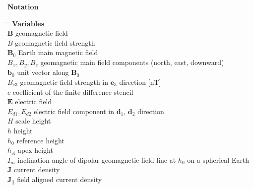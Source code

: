 %
\textbf{\Large{Notation}}
%
\begin{tabbing}
\hspace{5mm} \= \hspace{23mm} \=  \kill
%
\textbf{\Large{Variables}}                              \\

\>$\mathbf{B} $     \>  geomagnetic field  \\
\>$B$               \>  geomagnetic field strength   \\
\>$\mathbf{B}_0 $       \>  Earth main magnetic field  \\

\>$B_x, B_y, B_z$       \>  geomagnetic main field components (north, east, downward)  \\

\>$\mathbf{b}_0 $       \>  unit vector along $\mathbf{B}_0 $  \\

\>$B_{e3}$        	\>  geomagnetic field strength in $\mathbf{e}_3$ direction [nT]   \\

\>$c$        		\>  coefficient of the finite difference stencil   \\

\>$\mathbf E$        	\>  electric field   \\

\>$E_{d1}, E_{d2}$      \>  electric field component in $\mathbf{d}_1$,
                            $\mathbf{d}_2$ direction  \\

\>$H$        		\>  scale height    \\

\>$h$        		\>  height   \\

\>$h_0$        		\>  reference height   \\

\>$h_A$        		\>  apex height   \\

\>$I_m$        		\>  inclination angle of dipolar geomagnetic field line at $h_0$ on a spherical Earth  \\

\>$\mathbf J$        	\>  current density   \\

\>$\mathbf J_{||}$      \>  field aligned current density   \\


\end{tabbing}
